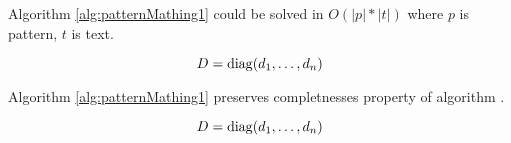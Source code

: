 \begin{theorem}
Algorithm \ref{alg:patternMathing1} could  be solved in $ O(|p| * |t| )$ where $p$ is pattern, $t$ is text.

\begin{displaymath}
    D = \operatorname{diag}(d_1,\dots,d_n)
  \end{displaymath}
\end{theorem}

\begin{theorem}
Algorithm \ref{alg:patternMathing1} preserves completnesses property of algorithm \cite{luciv2019interactive}.

\begin{displaymath}
    D = \operatorname{diag}(d_1,\dots,d_n)
  \end{displaymath}
\end{theorem}
